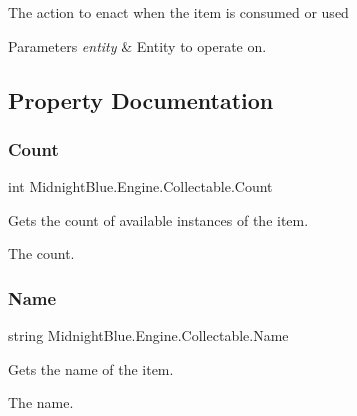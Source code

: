 The action to enact when the item is consumed or used 


\begin{DoxyParams}{Parameters}
{\em entity} & Entity to operate on.\\
\hline
\end{DoxyParams}


\subsection{Property Documentation}
\hypertarget{class_midnight_blue_1_1_engine_1_1_collectable_a61bb027d19c487afab716c9a0e73e6a0}{}\label{class_midnight_blue_1_1_engine_1_1_collectable_a61bb027d19c487afab716c9a0e73e6a0} 
\subsubsection{\texorpdfstring{Count}{Count}}
{\footnotesize\ttfamily int Midnight\+Blue.\+Engine.\+Collectable.\+Count\hspace{0.3cm}{\ttfamily [get]}}



Gets the count of available instances of the item. 

The count.\hypertarget{class_midnight_blue_1_1_engine_1_1_collectable_ac98670a6322f2dc0ecf173d1a5cced39}{}\label{class_midnight_blue_1_1_engine_1_1_collectable_ac98670a6322f2dc0ecf173d1a5cced39} 
\subsubsection{\texorpdfstring{Name}{Name}}
{\footnotesize\ttfamily string Midnight\+Blue.\+Engine.\+Collectable.\+Name\hspace{0.3cm}{\ttfamily [get]}}



Gets the name of the item. 

The name.\hypertarget{class_midnight_blue_1_1_engine_1_1_collectable_aa92d9bc3bf5cf9d01bbb92429293be56}{}\label{class_midnight_blue_1_1_engine_1_1_collectable_aa92d9bc3bf5cf9d01bbb92429293be56} 
